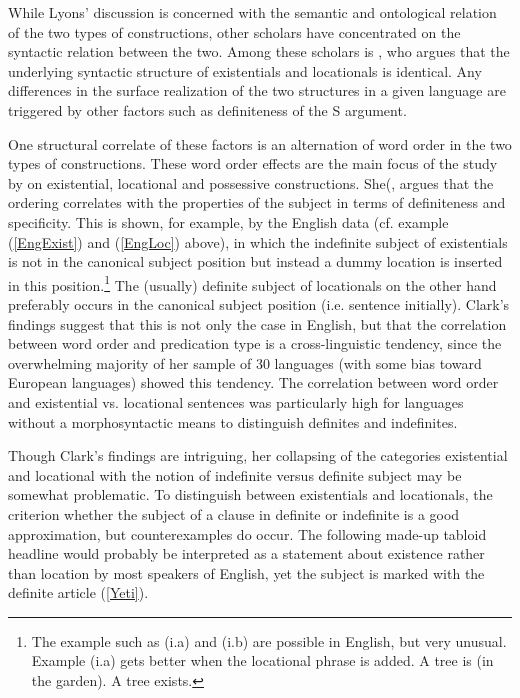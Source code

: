 While Lyons' discussion is concerned with the semantic and ontological relation of the two types of constructions, other scholars have concentrated on the syntactic relation between the two. 
Among these scholars is \citet{Freeze:1992}, who argues that the underlying syntactic structure of existentials and locationals is identical. 
Any differences in the surface realization of the two structures in a given language are triggered by other factors such as definiteness of the S argument.

One structural correlate of these factors is an alternation of word order in the two types of constructions. 
These word order effects are the main focus of the study by \citet{Clark:1978} on existential, locational and possessive constructions.
She(, argues that the ordering correlates with the properties of the subject in terms of definiteness and specificity.
This is shown, for example, by the English data (cf. example (\ref{EngExist}) and (\ref{EngLoc}) above), in which the indefinite subject of existentials is not in the canonical subject position but instead a dummy location is inserted in this position.\footnote{The example such as (i.a) and (i.b) are possible in English, but very unusual. Example (i.a) gets better when the locational phrase is added.
\eal
\ex A tree is (in the garden).
\ex A tree exists.
\zllast
}
The (usually) definite subject of locationals on the other hand preferably occurs in the canonical subject position (i.e. sentence initially).
Clark's findings suggest that this is not only the case in English, but that the correlation between word order and predication type is a cross-linguistic tendency, since the overwhelming majority of her sample of 30 languages (with some bias toward European languages) showed this tendency. 
The correlation between word order and existential vs. locational sentences was particularly high for languages without a morphosyntactic means to distinguish definites and indefinites.

Though Clark's findings are intriguing, her collapsing of the categories existential and locational with the notion of indefinite versus definite subject may be somewhat problematic. To distinguish between existentials and locationals, the criterion whether the subject of a clause in definite or indefinite is a good approximation, but counterexamples do occur. 
The following made-up tabloid headline would probably be interpreted as a statement about existence rather than location by most speakers of English, yet the subject is marked with the definite article (\ref{Yeti}).

